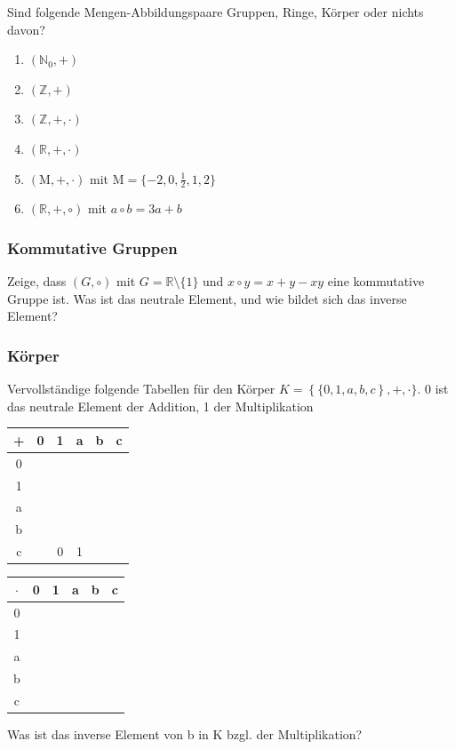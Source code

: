 \documentclass[11pt, a4paper]{article}
\begin{document}
Sind folgende Mengen-Abbildungspaare Gruppen, Ringe, Körper oder nichts davon?
\begin{enumerate}
	\item $\left( \mathbb{N}_0, + \right)$
	\item $\left( \mathbb{Z}, + \right)$
	\item $\left( \mathbb{Z}, +, \cdot \right)$
	\item $\left( \mathbb{R}, +, \cdot \right)$
	\item $\left( \mathrm{M}, +, \cdot \right)$ mit $\mathrm{M} = \{ -2,0,\frac{1
	}{2},1,2 \}$
	\item $\left( \mathbb{R}, +, \circ \right)$ mit $a \circ b = 3a + b$
\end{enumerate}

\subsubsection{Kommutative Gruppen}
Zeige, dass $(G,\circ)$ mit $G=\mathbb{R} \setminus \{1\}$ und $x \circ y = x+y-xy$ eine kommutative Gruppe ist. Was ist das neutrale Element, und wie bildet sich das inverse Element?

\subsubsection{Körper}
Vervollständige folgende Tabellen für den Körper $K = \left\{\{0,1,a,b,c\right\}, +, \cdot\} $. 0 ist das neutrale Element der Addition, 1 der Multiplikation
\begin{center}
	\begin{tabular}{c|ccccc}
		+ & 0 & 1 & a & b & c \\ \hline
		0 &  &  &  &  & \\
		1 &  &  &  &  & \\
		a &  &  &  &  & \\
		b &  &  &  &  & \\
		c &  & 0 & 1 &  & \\
	\end{tabular}
	\hspace{2cm}
	\begin{tabular}{c|ccccc}
		$\cdot$ & 0 & 1 & a & b & c \\ \hline
		0 &  &  &  &  & \\
		1 &  &  &  &  & \\
		a &  &  &  &  & \\
		b &  &  &  &  & \\
		c &  &  &  &  & \\
	\end{tabular}
\end{center}
Was ist das inverse Element von b in K bzgl. der Multiplikation?
\end{document}
